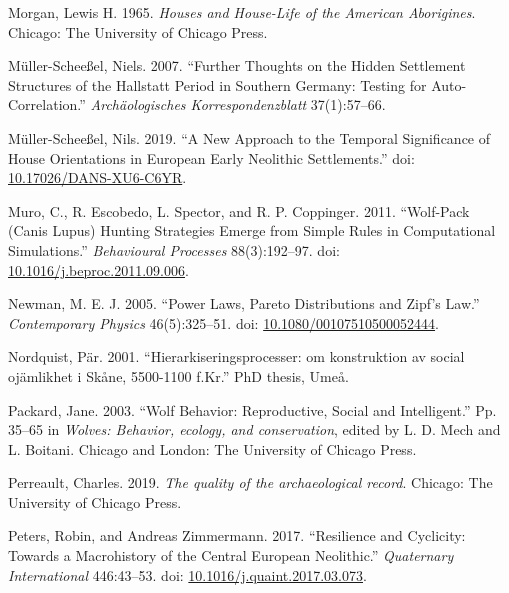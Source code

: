 \documentclass[
  12pt,
]{book}
\newlength{\cslhangindent}
\newlength{\cslentryspacingunit} %
\newenvironment{CSLReferences}[2] %
 {%
  \setlength{\parindent}{0pt}
  \ifodd #1
  \let\oldpar\par
  \def\par{\hangindent=\cslhangindent\oldpar}
  \fi
  \setlength{\parskip}{#2\cslentryspacingunit}
 }%
 {}
\begin{document}
\begin{CSLReferences}{1}{0}
\leavevmode{}%
Morgan, Lewis H. 1965. \emph{Houses and House-Life of the American Aborigines}. Chicago: The University of Chicago Press.

\leavevmode{}%
Müller-Scheeßel, Niels. 2007. {``Further Thoughts on the Hidden Settlement Structures of the Hallstatt Period in Southern Germany: Testing for Auto-Correlation.''} \emph{Archäologisches Korrespondenzblatt} 37(1):57--66.

\leavevmode{}%
Müller-Scheeßel, Nils. 2019. {``A New Approach to the Temporal Significance of House Orientations in European Early Neolithic Settlements.''} doi: \href{https://doi.org/10.17026/DANS-XU6-C6YR}{10.17026/DANS-XU6-C6YR}.

\leavevmode{}%
Muro, C., R. Escobedo, L. Spector, and R. P. Coppinger. 2011. {``Wolf-Pack (Canis Lupus) Hunting Strategies Emerge from Simple Rules in Computational Simulations.''} \emph{Behavioural Processes} 88(3):192--97. doi: \href{https://doi.org/10.1016/j.beproc.2011.09.006}{10.1016/j.beproc.2011.09.006}.

\leavevmode{}%
Newman, M. E. J. 2005. {``Power Laws, Pareto Distributions and Zipf's Law.''} \emph{Contemporary Physics} 46(5):325--51. doi: \href{https://doi.org/10.1080/00107510500052444}{10.1080/00107510500052444}.

\leavevmode{}%
Nordquist, Pär. 2001. {``Hierarkiseringsprocesser: om konstruktion av social ojämlikhet i Skåne, 5500-1100 f.Kr.''} PhD thesis, Umeå.

\leavevmode{}%
Packard, Jane. 2003. {``Wolf Behavior: Reproductive, Social and Intelligent.''} Pp. 35--65 in \emph{Wolves: Behavior, ecology, and conservation}, edited by L. D. Mech and L. Boitani. {Chicago and London}: {The University of Chicago Press}.

\leavevmode{}%
Perreault, Charles. 2019. \emph{The quality of the archaeological record}. Chicago: The University of Chicago Press.

\leavevmode{}%
Peters, Robin, and Andreas Zimmermann. 2017. {``Resilience and Cyclicity: Towards a Macrohistory of the Central European Neolithic.''} \emph{Quaternary International} 446:43--53. doi: \href{https://doi.org/10.1016/j.quaint.2017.03.073}{10.1016/j.quaint.2017.03.073}.


\end{CSLReferences}
\end{document}
